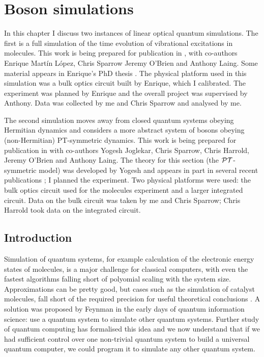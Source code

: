 \chapter{Boson simulations}
\label{ch:Simulations}
In this chapter I discuss two instances of linear optical quantum simulations.
The first is a full simulation of the time evolution of vibrational excitations
in molecules. This work is being prepared for publication in \cite{molecules},
with co-authors Enrique Mart\'in L\'opez, Chris Sparrow Jeremy O'Brien and
Anthony Laing. Some material appears in Enrique's PhD thesis \cite{enrique}. The
physical platform used in this simulation was a bulk optics circuit built by
Enrique, which I calibrated. The experiment was planned by Enrique and the
overall project was supervised by Anthony. Data was collected by me and Chris
Sparrow and analysed by me.

The second simulation moves away from closed quantum systems obeying Hermitian
dynamics and considers a more abstract system of bosons obeying (non-Hermitian) 
PT-symmetric dynamics. This work is being prepared for publication in
\cite{pt-prep} with co-authors Yogesh Joglekar, Chris Sparrow, Chris Harrold,
Jeremy O'Brien and Anthony Laing. The theory for this section (the
\(\mathcal{PT}\)-symmetric model) was developed by Yogesh and appears in part in several
recent publications \cite{yogesh03, yogesh04, yogesh17}; I planned the
experiment. Two physical platforms were used: the bulk optics circuit used for
the molecules experiment and a larger integrated circuit. Data on the bulk
circuit was taken by me and Chris Sparrow; Chris Harrold took data on the
integrated circuit.

\section{Introduction}
\label{sec:SimIntro}
Simulation of quantum systems, for example calculation of the electronic energy
states of molecules,
is a major challenge for classical computers, with even the fastest algorithms
falling short of polyomial scaling with the system size. Approximations can be
pretty good, but cases such as the simulation of catalyst molecules, fall short
of the required precision for useful theoretical conclusions
\cite{qsim-poulin}. A solution
was proposed by Feynman \cite{qsim-feynman} in the early days of quantum
information science: use a quantum system to simulate other quantum systems.
Further study of quantum computing has formalised this idea and we now
understand that if we had sufficient control over one non-trivial quantum system
to build a universal quantum computer, we could program it to simulate any other
quantum system.

